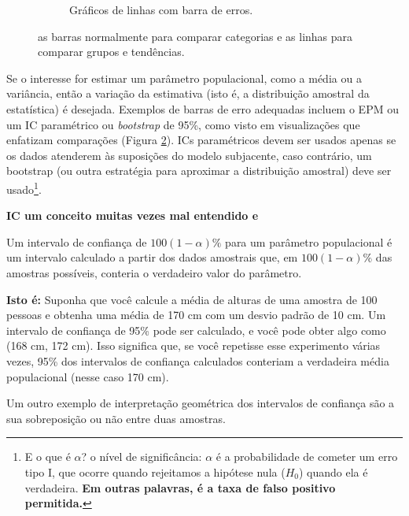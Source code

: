 \documentclass[article]{memoir}
\begin{document}
\begin{figure}[ht]
\begin{minipage}{0.7\textwidth}
\begin{subfigure}[b]{0.45\textwidth}
			\caption{Gráficos de linhas com barra de erros.}
			\label{fig:sub2}
		\end{subfigure}
	\end{minipage}
	\caption{as barras normalmente para comparar categorias e as linhas para comparar grupos e tendências.}
	\label{fig:ex_bar_lines}
\end{figure}

Se o interesse for estimar um parâmetro populacional, como a média ou a variância, então a variação da estimativa (isto é, a distribuição amostral da estatística) é desejada. Exemplos de barras de erro adequadas incluem o EPM ou um IC paramétrico ou \textit{bootstrap} de 95\%, como visto em visualizações que enfatizam comparações (Figura	\ref{fig:ex_bar_lines}). ICs paramétricos devem ser usados apenas se os dados atenderem às suposições do modelo subjacente, caso contrário, um bootstrap (ou outra estratégia para aproximar a distribuição amostral) deve ser usado\footnote{E o que é $\alpha$? o nível de significância: 
	$\alpha$ é a probabilidade de cometer um erro tipo I, que ocorre quando rejeitamos a hipótese nula ($H_0$)
	 quando ela é verdadeira. \textbf{Em outras palavras, é a taxa de falso positivo permitida.}}. 

\begin{tcolorbox}
	\textbf{IC um conceito muitas vezes mal entendido \cite{belia2005} e \cite{hoekstra2014}}
	
	Um intervalo de confiança de $100(1 − \alpha)\%$  para um parâmetro populacional é um intervalo calculado a partir dos dados amostrais que, em $100(1 − \alpha)\%$ das amostras possíveis, conteria o verdadeiro valor do parâmetro.
	
	\textbf{Isto é:} Suponha que você calcule a média de alturas de uma amostra de 100 pessoas e obtenha uma média de 170 cm com um desvio padrão de 10 cm. Um intervalo de confiança de 95\% pode ser calculado, e você pode obter algo como (168 cm, 172 cm). Isso significa que, se você repetisse esse experimento várias vezes, 95\% dos intervalos de confiança calculados conteriam a verdadeira média populacional (nesse caso 170 cm).
	
\end{tcolorbox} 

Um outro exemplo de interpretação geométrica dos intervalos de confiança são a sua sobreposição ou não entre duas amostras.
\end{document}
